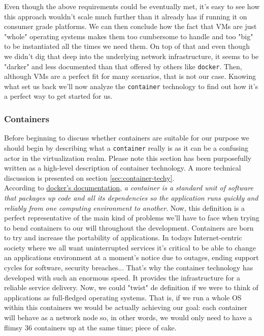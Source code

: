                 Even though the above requirements could be eventually met, it's easy to see how this approach wouldn't scale much further than it already has if running it on consumer grade platforms. We can then conclude how the fact that VMs are just "whole" operating systems makes them too cumbersome to handle and too "big" to be instantiated all the times we need them. On top of that and even though we didn't dig that deep into the underlying network infrastructure, it seems to be "darker" and less documented than that offered by others like \texttt{docker}. Then, although VMs are a perfect fit for many scenarios, that is not our case. Knowing what set us back we'll now analyze the \texttt{container} technology to find out how it's a perfect way to get started for us.

            \subsubsection{Containers} \label{sec:container-intro}
                Before beginning to discuss whether containers are suitable for our purpose we should begin by describing what a \texttt{container} really is as it can be a confusing actor in the virtualization realm. Please note this section has been purposefully written as a high-level description of container technology. A more technical discussion is presented on section \ref{sec:container-techy}.\\

                According to \href{https://www.docker.com/resources/what-container}{docker's documentation}, \textit{a container is a standard unit of software that packages up code and all its dependencies so the application runs quickly and reliably from one computing environment to another}. Now, this definition is a perfect representative of the main kind of problems we'll have to face when trying to bend containers to our will throughout the development. Containers are born to try and increase the portability of applications. In todays Internet-centric society where we all want uninterrupted services it's critical to be able to change an applications environment at a moment's notice due to outages, ending support cycles for software, security breaches... That's why the container technology has developed with such an enormous speed. It provides the infrastructure for a reliable service delivery. Now, we could "twist" de definition if we were to think of applications as full-fledged operating systems. That is, if we run a whole OS within this containers we would be actually achieving our goal: each container will behave as a network node so, in other words, we would only need to have a flimsy $36$ containers up at the same time; piece of cake.\\

